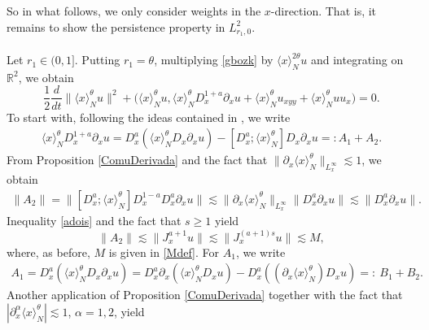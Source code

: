 \documentclass[reqno]{amsart}
\newcommand{\D}{D^{a}}
\newcommand{\la}{\langle x \rangle_{N}}
\newcommand{\R}{\mathbb R}
\numberwithin{equation}{section}
\begin{document}
So in what follows, we only consider weights in the $x$-direction. That is, it remains to show the persistence property in $L^2_{r_1,0}$.\\

 \\

Let $r_1\in (0,1].$
Putting $r_1=\theta$, multiplying  
\eqref{gbozk} by $\la^{2\theta}u$ and integrating on $\R^{2}$, we obtain
\begin{equation}\label{106x}
\frac{1}{2}\frac{d}{dt}\|\la^{\theta}u\|^{2}+
\Big(\la^{\theta}u,\la^{\theta}D^{1+a}_x\partial_{x}u+
\la^{\theta}u_{xyy}+\la^{\theta}uu_{x}\Big)=0.
\end{equation}
To start with, following the ideas contained in \cite{FLP1}, we write
\begin{equation}\label{adois0}
\begin{split}
\langle x \rangle_{N}^{\theta}D^{1+a}_x\partial_{x}u=\D_x (\la^{\theta} D_x \partial_{x}u)-[\D_x;\la^{\theta}]D_x\partial_{x}u
=: A_1+A_2.
\end{split}
\end{equation}
From Proposition \ref{ComuDerivada} and the fact that  $\|\partial_x\la^{\theta}\|_{L^\infty_x}\lesssim 1$, we obtain
\begin{equation}\label{adois}
\begin{split}
\|A_2\|=\|[\D_x;\la^{\theta}]D^{1-a}_x D^a_x \partial_{x}u\|
               \lesssim \|\partial_x \la^{\theta}\|_{L^\infty_x}\|\D_x \partial_{x}u\|
               \lesssim \|\D_x \partial_{x}u\|.
\end{split}
\end{equation}
 Inequality \eqref{adois} and the fact that $s\geq1$ yield
\begin{equation*}
\|A_2\|\lesssim \|J_x^{a+1}u\|\lesssim \|J_x^{(a+1)s}u\|\lesssim M,
\end{equation*}
where, as before, $M$ is given in \eqref{Mdef}.
For  $A_1$,  we write
\begin{equation*}
\begin{split}
A_1=\D_x(\la^{\theta} D_x\partial_{x}u)=\D_x \partial_{x}(\la^{\theta} D_x u)-\D_x ((\partial_{x} \la^{\theta})D_x u)
=:\ B_1+B_2.
\end{split}
\end{equation*}
Another application of Proposition \ref{ComuDerivada} together with the fact that $|\partial_x^\alpha\la^\theta|\lesssim 1$, $\alpha=1,2$, yield
\end{document}
